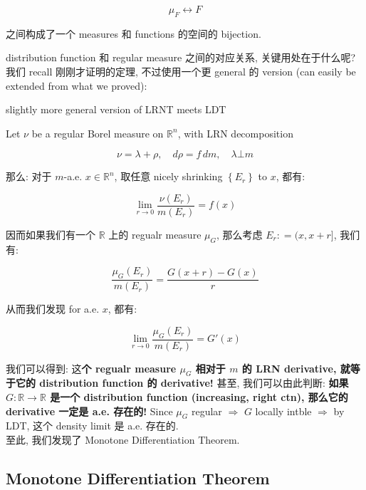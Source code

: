 \documentclass{qlnotes-export}
\begin{document}
\[\mu_{F}\operatorname{\leftrightarrow ︎}F\]

之间构成了一个 measures 和 functions 的空间的 bijection.

distribution function 和 regular measure 之间的对应关系, 关键用处在于什么呢? 我们 recall 刚刚才证明的定理, 不过使用一个更 general 的 version (can easily be extended from what we proved):

\begin{theorem}{slightly more general version of LRNT meets LDT}\label{thm-12-differentiation-on-real-spaces-slightly-more-general-version-of-lrnt-meets-ldt}

Let \(\nu\) be a regular Borel measure on \({\mathbb{R}}^{n}\), with LRN decomposition

\[\nu = \lambda + \rho,\quad d\rho = f\, dm,\quad\lambda\bot m\]

那么: 对于 \(m\)-a.e. \(x \in {\mathbb{R}}^{n}\), 取任意 nicely shrinking \(\left\{ E_{r} \right\}\) to \(x\), 都有:

\[\lim\limits_{r\rightarrow 0}\frac{\nu(E_{r})}{m(E_{r})} = f(x)\]

\end{theorem}

因而如果我们有一个 \(\mathbb{R}\) 上的 regualr measure \(\mu_{G}\), 那么考虑 \(E_{r}: = (x,x + r\rbrack\), 我们有:

\[\frac{\mu_{G}(E_{r})}{m(E_{r})} = \frac{G(x + r) - G(x)}{r}\]

从而我们发现 for a.e. \(x\), 都有:

\[\lim\limits_{r\rightarrow 0}\frac{\mu_{G}(E_{r})}{m(E_{r})} = G'(x)\]

我们可以得到: 这\textbf{个 regualr measure \(\mu_{G}\) 相对于 \(m\) 的 LRN derivative, 就等于它的 distribution function 的 derivative!} 甚至, 我们可以由此判断: \textbf{如果 \(G:{\mathbb{R}}\rightarrow{\mathbb{R}}\) 是一个 distribution function (increasing, right ctn), 那么它的 derivative 一定是 a.e. 存在的!} Since \(\mu_{G}\) regular \(\Longrightarrow\) \(G\) locally intble \(\Longrightarrow\) by LDT, 这个 density limit 是 a.e. 存在的.\\
至此, 我们发现了 Monotone Differentiation Theorem.\\

\subsection{Monotone Differentiation Theorem}\label{monotone-differentiation-theorem}
\end{document}
